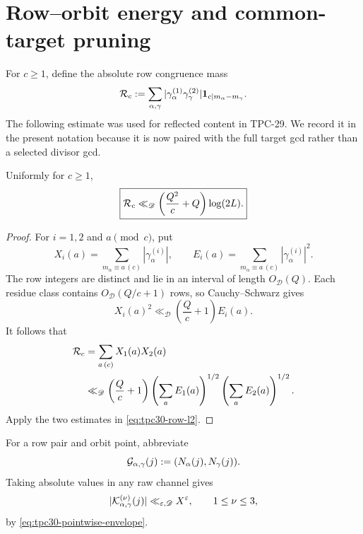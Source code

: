 \section{Row--orbit energy and common-target pruning}
\label{sec:tpc30-row-orbit}

For $c\ge1$, define the absolute row congruence mass
\begin{equation}
 \mathcal R_c
 :=\sum_{\alpha,\gamma}
 |\gamma_\alpha^{(1)}\gamma_\gamma^{(2)}|
 \mathbf 1_{c\mid m_\alpha-m_\gamma}.
 \label{eq:tpc30-row-congruence-mass}
\end{equation}
The following estimate was used for reflected content in TPC-29.  We
record it in the present notation because it is now paired with the
full target gcd rather than a selected divisor gcd.

\begin{lemma}
\label{lem:tpc30-row-residue-energy}
Uniformly for $c\ge1$,
\begin{equation}
 \boxed{
 \mathcal R_c
 \ll_{\mathscr D}
 \left(\frac{Q^2}{c}+Q\right)\log(2L).}
 \label{eq:tpc30-row-residue-bound}
\end{equation}
\end{lemma}

\begin{proof}
For $i=1,2$ and $a\pmod c$, put
\[
 X_i(a)=\sum_{m_\alpha\equiv a\, (c)}
 |\gamma_\alpha^{(i)}|,
 \qquad
 E_i(a)=\sum_{m_\alpha\equiv a\, (c)}
 |\gamma_\alpha^{(i)}|^2.
\]
The row integers are distinct and lie in an interval of length
$O_{\mathscr D}(Q)$.  Each residue class contains
$O_{\mathscr D}(Q/c+1)$ rows, so Cauchy--Schwarz gives
\[
 X_i(a)^2
 \ll_{\mathscr D}\left(\frac Qc+1\right)E_i(a).
\]
It follows that
\begin{align*}
 \mathcal R_c
 &=\sum_{a\, (c)}X_1(a)X_2(a)\\
 &\ll_{\mathscr D}
 \left(\frac Qc+1\right)
 \left(\sum_aE_1(a)\right)^{1/2}
 \left(\sum_aE_2(a)\right)^{1/2}.
\end{align*}
Apply the two estimates in \eqref{eq:tpc30-row-l2}.
\end{proof}

For a row pair and orbit point, abbreviate
\begin{equation}
 \mathcal G_{\alpha,\gamma}(j)
 :=(N_\alpha(j),N_\gamma(j)).
 \label{eq:tpc30-physical-target-gcd}
\end{equation}
Taking absolute values in any raw channel gives
\begin{equation}
 |\mathcal K^{(\nu)}_{\alpha,\gamma}(j)|
 \ll_{\varepsilon,\mathscr D}X^\varepsilon,
 \qquad 1\le\nu\le3,
 \label{eq:tpc30-kernel-envelope}
\end{equation}
by \eqref{eq:tpc30-pointwise-envelope}.

